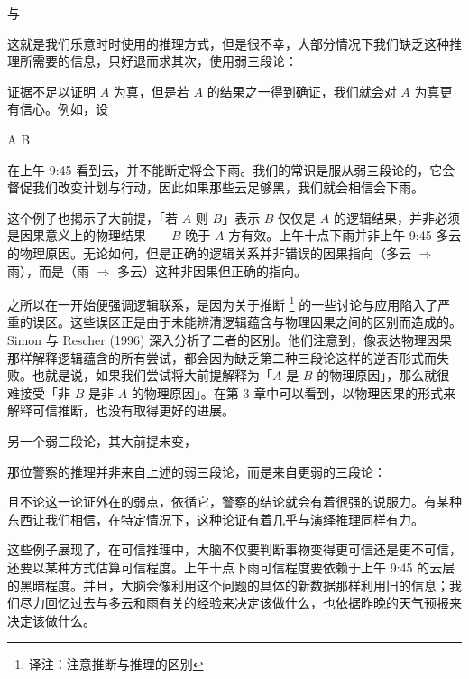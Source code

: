 与

\placeformula[syllogism-2]
\startformula
{}
\stopformula

这就是我们乐意时时使用的推理方式，但是很不幸，大部分情况下我们缺乏这种推理所需要的信息，只好退而求其次，使用弱三段论：

\placeformula
\startformula
{}
\stopformula

证据不足以证明 $A$ 为真，但是若 $A$ 的结果之一得到确证，我们就会对 $A$ 为真更有信心。例如，设

\startformula
\startalign
\NC A\equiv\NC{}\NR
\NC B\equiv\NC{}\NR
\stopalign
\stopformula

在上午 9:45 看到云，并不能断定将会下雨。我们的常识是服从弱三段论的，它会督促我们改变计划与行动，因此如果那些云足够黑，我们就会相信会下雨。

这个例子也揭示了大前提，「若 $A$ 则 $B$」表示 $B$ 仅仅是 $A$ 的逻辑结果，并非必须是因果意义上的物理结果——$B$ 晚于 $A$ 方有效。上午十点下雨并非上午 9:45 多云的物理原因。无论如何，但是正确的逻辑关系并非错误的因果指向（多云 $\Rightarrow$ 雨），而是（雨 $\Rightarrow$ 多云）这种非因果但正确的指向。

之所以在一开始便强调逻辑联系，是因为关于推断 \footnote{译注：注意推断与推理的区别} 的一些讨论与应用陷入了严重的误区。这些误区正是由于未能辨清逻辑蕴含与物理因果之间的区别而造成的。Simon 与 Rescher (1996) 深入分析了二者的区别。他们注意到，像表达物理因果那样解释逻辑蕴含的所有尝试，都会因为缺乏第二种三段论这样的逆否形式而失败。也就是说，如果我们尝试将大前提解释为「$A$ 是 $B$ 的物理原因」，那么就很难接受「非 $B$ 是非 $A$ 的物理原因」。在第 3 章中可以看到，以物理因果的形式来解释可信推断，也没有取得更好的进展。

另一个弱三段论，其大前提未变，

\placeformula
\startformula
{}
\stopformula

那位警察的推理并非来自上述的弱三段论，而是来自更弱的三段论：

\placeformula
\startformula
{}
\stopformula

且不论这一论证外在的弱点，依循它，警察的结论就会有着很强的说服力。有某种东西让我们相信，在特定情况下，这种论证有着几乎与演绎推理同样有力。

这些例子展现了，在可信推理中，大脑不仅要判断事物变得更可信还是更不可信，还要以某种方式估算可信程度。上午十点下雨可信程度要依赖于上午 9:45 的云层的黑暗程度。并且，大脑会像利用这个问题的具体的新数据那样利用旧的信息；我们尽力回忆过去与多云和雨有关的经验来决定该做什么，也依据昨晚的天气预报来决定该做什么。

